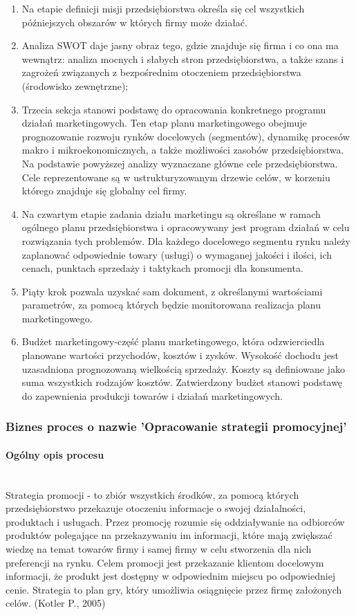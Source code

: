 \documentclass[a4paper, 12pt]{article}
\begin{document}
\begin{enumerate}
	\item Na etapie definicji misji przedsiębiorstwa określa się cel wszystkich późniejszych obszarów w których firmy może działać.
	\item Analiza SWOT daje jasny obraz tego, gdzie znajduje się firma i co ona ma wewnątrz: analiza mocnych i słabych stron przedsiębiorstwa, a także szans i zagrożeń związanych z bezpośrednim otoczeniem przedsiębiorstwa (środowisko zewnętrzne);
	\item Trzecia sekcja stanowi podstawę do opracowania konkretnego programu działań marketingowych. Ten etap planu marketingowego obejmuje prognozowanie rozwoju rynków docelowych (segmentów), dynamikę procesów makro i mikroekonomicznych, a także możliwości zasobów przedsiębiorstwa. Na podstawie powyższej analizy wyznaczane główne cele  przedsiębiorstwa. Cele reprezentowane są w ustrukturyzowanym drzewie celów, w korzeniu którego znajduje się globalny cel firmy.
	\item Na czwartym etapie zadania działu marketingu są określane w ramach ogólnego planu przedsiębiorstwa i opracowywany jest program działań w celu rozwiązania tych problemów. Dla każdego docelowego segmentu rynku należy zaplanować odpowiednie towary (usługi) o wymaganej jakości i ilości, ich cenach, punktach sprzedaży i taktykach promocji dla konsumenta.
	\item Piąty krok pozwala uzyskać sam dokument, z określanymi wartościami parametrów, za pomocą których będzie monitorowana realizacja planu marketingowego.
	\item Budżet marketingowy-część planu marketingowego, która odzwierciedla planowane wartości przychodów, kosztów i zysków. Wysokość dochodu jest uzasadniona prognozowaną wielkością sprzedaży. Koszty są definiowane jako suma wszystkich rodzajów kosztów. Zatwierdzony budżet stanowi podstawę do zapewnienia produkcji towarów i działań marketingowych.
\end{enumerate}



\subsubsection{Biznes proces o nazwie 'Opracowanie strategii promocyjnej'}
\paragraph{Ogólny opis procesu}\mbox{}\\
\hspace*{1 cm}Strategia promocji - to zbiór wszystkich środków, za pomocą których przedsiębiorstwo przekazuje otoczeniu informacje o swojej działalności, produktach i usługach. Przez promocję rozumie się oddziaływanie na odbiorców produktów polegające na przekazywaniu im informacji, które mają zwiększać wiedzę na temat towarów firmy i samej firmy w celu stworzenia dla nich preferencji na rynku.
\newline \hspace*{1 cm}Celem promocji jest przekazanie klientom docelowym informacji, że produkt jest dostępny w odpowiednim miejscu po odpowiedniej cenie. Strategia to plan gry, który umożliwia osiągnięcie przez firmę założonych celów. (Kotler P., 2005)
\end{document}

